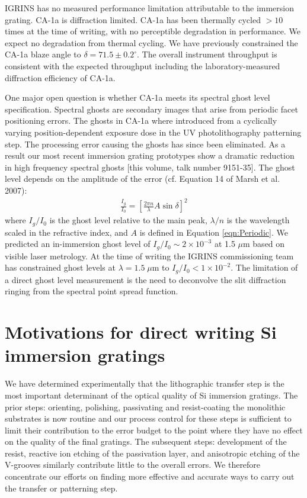 \documentclass[]{spie}  %
\begin{document}
IGRINS has no measured performance limitation attributable to the immersion grating.  CA-1a is diffraction limited.  CA-1a has been thermally cycled $>10$ times at the time of writing, with no perceptible degradation in performance.  We expect no degradation from thermal cycling.  We have previously constrained the CA-1a blaze angle to $\delta = 71.5\pm 0.2^\circ$.  The overall instrument throughput is consistent with the expected throughput including the laboratory-measured diffraction efficiency of CA-1a.

One major open question is whether CA-1a meets its spectral ghost level specification.  Spectral ghosts are secondary images that arise from periodic facet positioning errors\cite{2007sdf..book.....J}. The ghosts in CA-1a where introduced from a cyclically varying position-dependent exposure dose in the UV photolithography patterning step.  The processing error causing the ghosts has since been eliminated.  As a result our most recent immersion grating prototypes show a dramatic reduction in high frequency spectral ghosts [this volume, talk number 9151-35]\cite{2014SPIE.BROOKS.GRATINGS}.  The ghost level depends on the amplitude of the error (cf. Equation 14 of Marsh et al. 2007\cite{2007ApOpt..46.3400M}):
\begin{eqnarray}
	\frac{I_g}{I_0}=[ \frac{2\pi n}{\lambda}A \sin{\delta} ]^2	 \label{eqn:GLevel}
\end{eqnarray}
where $I_g/I_0$ is the ghost level relative to the main peak, $\lambda/n$ is the wavelength scaled in the refractive index, and $A$ is defined in Equation \ref{eqn:Periodic}.  We predicted an in-immersion ghost level of $I_g/I_0 \sim2\times10^{-3}$ at 1.5 $\mu$m based on visible laser metrology\cite{2012SPIE.8450E..2SG}.  At the time of writing the IGRINS commissioning team has constrained ghost levels at $\lambda=1.5 \; \mu$m to $I_g/I_0 < 1\times10^{-2}$.  The limitation of a direct ghost level measurement is the need to deconvolve the slit diffraction ringing from the spectral point spread function.

\section{Motivations for direct writing Si immersion gratings}
We have determined experimentally that the lithographic transfer step is the most important determinant of the optical quality of Si immersion gratings.  The prior steps: orienting, polishing, passivating and resist-coating the monolithic substrates is now routine and our process control for these steps is sufficient to limit their contribution to the error budget to the point where they have no effect on the quality of the final gratings\cite{2007ApOpt..46.3400M, 2014SPIE.BROOKS.GRATINGS}.  The subsequent steps: development of the resist, reactive ion etching of the passivation layer, and anisotropic etching of the V-grooves similarly contribute little to the overall errors.  We therefore concentrate our efforts on finding more effective and accurate ways to carry out the transfer or patterning step.  
\end{document}
